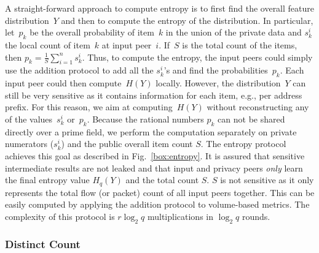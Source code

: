 \documentclass[letterpaper,11pt,onecolumn,titlepage]{article}
\begin{document}
A straight-forward approach to compute entropy is to first find the
overall feature distribution~$Y$ and then to compute the entropy of
the distribution. In particular, let~$p_k$ be the overall probability
of item~$k$ in the union of the private data and $s_k^i$ the local
count of item~$k$ at input peer~$i$. If~$S$ is the total count of the items,
then $p_k = \frac{1}{S}\sum^n_{i=1}{s_k^i}$.  Thus, to compute the
entropy, the input peers could simply use the addition protocol to add all
the $s_k^i$'s and find the probabilities~$p_k$. Each input peer could then
compute~$H(Y)$ locally. However, the distribution~$Y$ can still be
very sensitive as it contains information for each item, e.g., per 
address prefix. For this reason, we aim at computing~$H(Y)$ without
reconstructing any of the values~$s_k^i$ or~$p_k$. 
Because the rational numbers $p_k$ can not be shared directly over a prime field, we
perform the computation separately on private numerators ($s_k^i$) and the public
overall item count $S$. The entropy protocol achieves this goal as described in Fig.~\ref{box:entropy}.
It is assured that sensitive intermediate results are
not leaked and that input and privacy peers \emph{only} learn the final
entropy value $H_q(Y)$ and the total count $S$. $S$ is not sensitive as it only 
represents the total flow (or packet) count of all input peers together. This can be easily computed 
by applying the addition protocol to volume-based metrics. 
The complexity of this protocol is $r\log_2 q$ multiplications in $\log_2 q$ rounds.




\subsubsection{Distinct Count}
\end{document}
